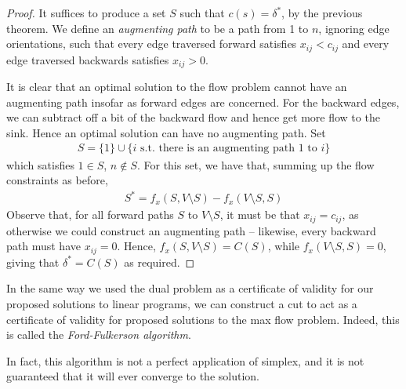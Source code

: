 \documentclass{../template/note}
\begin{document}
    \begin{proof}
        It suffices to produce a set $S$ such that $c(s) = \delta^*$, by the previous theorem. We define an \emph{augmenting path} to be a path from 1 to $n$, ignoring edge orientations, such that every edge traversed forward satisfies $x_{ij} < c_{ij}$ and every edge traversed backwards satisfies $x_{ij} > 0$.

        It is clear that an optimal solution to the flow problem cannot have an augmenting path insofar as forward edges are concerned. For the backward edges, we can subtract off a bit of the backward flow and hence get more flow to the sink. Hence an optimal solution can have no augmenting path. Set
        \begin{align*}
            S = \{1\} \cup \{i \text{ s.t. there is an augmenting path 1 to } i\}
        \end{align*}
        which satisfies $1 \in S$, $n \notin S$. For this set, we have that, summing up the flow constraints as before,
        \begin{align*}
            S^* = f_x(S, V \setminus S) - f_x(V \setminus S, S)
        \end{align*}
        Observe that, for all forward paths $S$ to $V \setminus S$, it must be that $x_{ij} = c_{ij}$, as otherwise we could construct an augmenting path -- likewise, every backward path must have $x_{ij} = 0$. Hence, $f_x(S, V \setminus S) = C(S)$, while $f_x(V \setminus S, S) = 0$, giving that $\delta^* = C(S)$ as required.
    \end{proof}
    
    \begin{remark*}
        In the same way we used the dual problem as a certificate of validity for our proposed solutions to linear programs, we can construct a cut to act as a certificate of validity for proposed solutions to the max flow problem. Indeed, this is called the \emph{Ford-Fulkerson algorithm}.
    \end{remark*}
    
    In fact, this algorithm is not a perfect application of simplex, and it is not guaranteed that it will ever converge to the solution.
    
    
    
    
    
    
    
    
    
    
    
\end{document}
